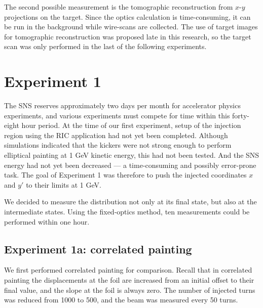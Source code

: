 The second possible measurement is the tomographic reconstruction from $x$-$y$ projections on the target. Since the optics calculation is time-consuming, it can be run in the background while wire-scans are collected. The use of target images for tomographic reconstruction was proposed late in this research, so the target scan was only performed in the last of the following experiments.


\section{Experiment 1}

The SNS reserves approximately two days per month for accelerator physics experiments, and various experiments must compete for time within this forty-eight hour period. At the time of our first experiment, setup of the injection region using the RIC application had not yet been completed. Although simulations indicated that the kickers were not strong enough to perform elliptical painting at 1 GeV kinetic energy, this had not been tested. And the SNS energy had not yet been decreased — a time-consuming and possibly error-prone task. The goal of Experiment 1 was therefore to push the injected coordinates $x$ and $y'$ to their limits at 1 GeV.

We decided to measure the distribution not only at its final state, but also at the intermediate states. Using the fixed-optics method, ten measurements could be performed within one hour. 

\subsection{Experiment 1a: correlated painting}

We first performed correlated painting for comparison. Recall that in correlated painting the displacements at the foil are increased from an initial offset to their final value, and the slope at the foil is always zero. The number of injected turns was reduced from 1000 to 500, and the beam was measured every 50 turns. 

